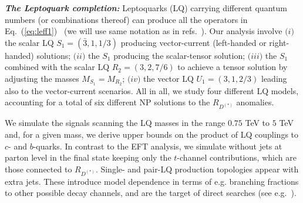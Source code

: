 \documentclass[%
 reprint,
 superscriptaddress,preprintnumbers,
 amsmath,amssymb,
 aps,
]{revtex4-1}
\begin{document}


\textit{\textbf{The Leptoquark completion:}} Leptoquarks (LQ) carrying different quantum numbers (or combinations thereof) can produce all the operators in Eq.~(\ref{eq:leff1})~\cite{Sakaki:2013bfa,Alonso:2015sja,Barbieri:2015yvd,Freytsis:2015qca,Fajfer:2015ycq,Li:2016vvp,Barbieri:2016las,Becirevic:2016yqi,Crivellin:2017zlb,Cai:2017wry,Greljo:2018tuh,Assad:2017iib,DiLuzio:2017vat,Bordone:2017bld,Barbieri:2017tuq,Marzocca:2018wcf,Blanke:2018sro,Bordone:2018nbg,Becirevic:2018afm,DiLuzio:2018zxy,Angelescu:2018tyl,Heeck:2018ntp,Robinson:2018gza,Azatov:2018kzb} (we will use same notation as in refs.~\cite{Buchmuller:1986zs,Dorsner:2016wpm}). Our analysis involve $\textit{(i)}$ the scalar LQ $S_1=(\bar 3,1,1/3)$ producing vector-current (left-handed or right-handed) solutions; $\textit{(ii)}$ the $S_1$ producing the scalar-tensor solution; $\textit{(iii)}$ the $S_1$ combined with the scalar LQ $R_2=(3,2,7/6)$ to achieve a tensor solution by adjusting the masses $M_{S_1}= M_{R_2}$; $\textit{(iv)}$ the vector LQ $U_1=(3,1,2/3)$ leading also to the vector-current scenarios. All in all, we study four different LQ models, accounting for a total of six different NP solutions to the $R_{D^{(*)}}$ anomalies.   

We simulate the signals scanning the LQ masses in the range $0.75$ TeV to $5$ TeV and, for a given mass, we derive upper bounds on the product of LQ couplings to $c$- and $b$-quarks. In contrast to the EFT analysis, we simulate without jets at parton level in the final state keeping only the $t$-channel contributions, which are those connected to $R_{D^{(*)}}$. Single- and pair-LQ production topologies appear with extra jets. These introduce model dependence in terms of e.g. branching fractions to other possible decay channels, and are the target of direct searches (see e.g.~\cite{Diaz:2017lit,Dorsner:2018ynv}). 
\end{document}
